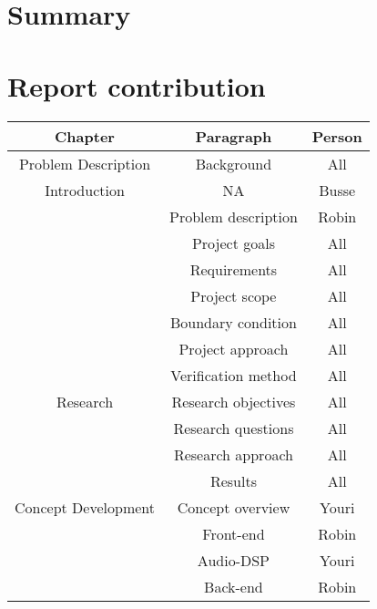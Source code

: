 \begin{justify}

\chapter*{Summary}


\newpage
\tableofcontents
\thispagestyle{empty}

\listoffigures
\thispagestyle{empty}

\listoftables
\thispagestyle{empty}

\newpage
\pagestyle{plain}

\chapter*{Report contribution}	%
\begin{table}[!h]
	\centering
\begin{tabular}{|c|c|c|}
		\hline
\textbf{Chapter} & \textbf{Paragraph} & \textbf{Person} \\ \hline
Problem Description			& Background					& All	 			\\ \hline
Introduction				& NA							& Busse 			\\ \hline
							& Problem description			& Robin				\\ \hline
							& Project goals					& All				\\ \hline
							& Requirements					& All 				\\ \hline
							& Project scope					& All 				\\ \hline
							& Boundary condition			& All				\\ \hline
							& Project approach				& All				\\ \hline
							& Verification method			& All				\\ \hline
Research 					& Research objectives			& All 				\\ \hline
							& Research questions			& All 				\\ \hline
							& Research approach				& All 				\\ \hline
							& Results						& All 				\\ \hline
Concept Development 		& Concept overview				& Youri				\\ \hline
							& Front-end						& Robin				\\ \hline
							& Audio-DSP						& Youri				\\ \hline
							& Back-end						& Robin				\\ \hline

\end{tabular}
\end{table}
\end{justify}
